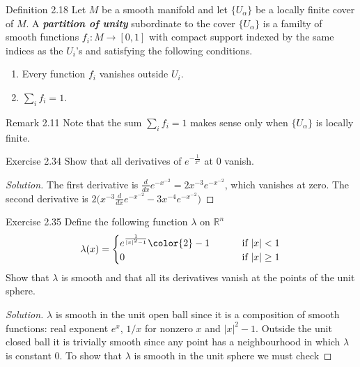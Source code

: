 \begin{thing3}{Definition 2.18}\label{def:2.18}\leavevmode
	Let \(M\) be a smooth manifold and let \(\{U_\alpha\}\) be a locally finite cover of \(M\). A \textit{\textbf{partition of unity}} subordinate to the cover \(\{U_\alpha\}\) is a familty of smooth functions \(f_i:M\to [0,1]\) with compact support indexed by the same indices as the \(U_i\)'s and satisfying the following conditions.
	\begin{enumerate}[label=(\alph*)]
	\item Every function \(f_i\) vanishes outside \(U_i\).
	\item \(\sum_i f_i=1\).
	\end{enumerate}
\end{thing3}

\begin{thing5}{Remark 2.11}\label{rk:2.11}\leavevmode
Note that the sum \(\sum_if_i=1\) makes sense only when \(\{U_\alpha\}\) is locally finite.
\end{thing5}

\begin{thing4}{Exercise 2.34}\label{exer:2.34}\leavevmode
Show that all derivatives of \(e^{-\frac{1}{x^2}}\) at 0 vanish.
\end{thing4}

\begin{proof}[Solution]\leavevmode
The first derivative is \(\frac{d}{dx}e^{-x^{-2}}=2x^{-3}e^{-x^{-2}}\), which vanishes at zero. The second derivative is \(2\Big(x^{-3}\frac{d}{dx}e^{-x^{-2}}-3x^{-4}e^{-x^{-2}}\Big)\)
\end{proof}

\begin{thing4}{Exercise 2.35}\label{exer:2.35}\leavevmode
Define the following function \(\lambda\) on \(\mathbb{R}^n\) 
\[\lambda(x)=\begin{cases}
	e^{\frac{1}{|x|^2-1}}{\color{2}-1}\qquad &\text{ if } |x|<1 \\
	0\qquad &\text{ if } |x|\geq 1
\end{cases}\]
Show that \(\lambda\) is smooth and that all its derivatives vanish at the points of the unit sphere.
\end{thing4}

\begin{proof}[Solution]\leavevmode
\(\lambda\) is smooth in the unit open ball since it is a composition of smooth functions: real exponent \(e^x\), \(1/x\) for nonzero  $x$ and \(|x|^2-1\). Outside the unit closed ball it is trivially smooth since any point has a neighbourhood in which \(\lambda\) is constant 0. To show that \(\lambda\) is smooth in the unit sphere we must check 
\end{proof}

